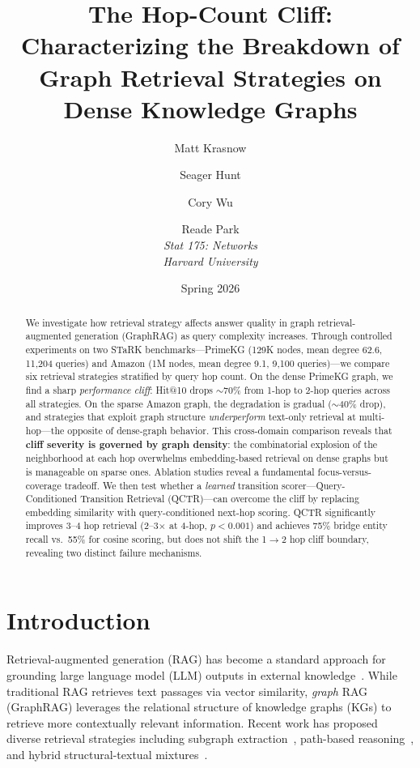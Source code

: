 \documentclass[11pt]{article}
\title{The Hop-Count Cliff: Characterizing the Breakdown of\\Graph Retrieval Strategies on Dense Knowledge Graphs}
\author{
  Matt Krasnow \and Seager Hunt \and Cory Wu \and Reade Park \\
  \textit{Stat 175: Networks} \\
  \textit{Harvard University}
}
\date{Spring 2026}
\begin{document}
\maketitle

\begin{abstract}
We investigate how retrieval strategy affects answer quality in graph retrieval-augmented generation (GraphRAG) as query complexity increases. Through controlled experiments on two STaRK benchmarks---PrimeKG (129K nodes, mean degree 62.6, 11,204 queries) and Amazon (1M nodes, mean degree 9.1, 9,100 queries)---we compare six retrieval strategies stratified by query hop count. On the dense PrimeKG graph, we find a sharp \textit{performance cliff}: Hit@10 drops $\sim$70\% from 1-hop to 2-hop queries across all strategies. On the sparse Amazon graph, the degradation is gradual ($\sim$40\% drop), and strategies that exploit graph structure \textit{underperform} text-only retrieval at multi-hop---the opposite of dense-graph behavior. This cross-domain comparison reveals that \textbf{cliff severity is governed by graph density}: the combinatorial explosion of the neighborhood at each hop overwhelms embedding-based retrieval on dense graphs but is manageable on sparse ones. Ablation studies reveal a fundamental focus-versus-coverage tradeoff. We then test whether a \textit{learned} transition scorer---Query-Conditioned Transition Retrieval (QCTR)---can overcome the cliff by replacing embedding similarity with query-conditioned next-hop scoring. QCTR significantly improves 3--4 hop retrieval (2--3$\times$ at 4-hop, $p < 0.001$) and achieves 75\% bridge entity recall vs.\ 55\% for cosine scoring, but does not shift the 1$\to$2 hop cliff boundary, revealing two distinct failure mechanisms.
\end{abstract}

\section{Introduction}

Retrieval-augmented generation (RAG) has become a standard approach for grounding large language model (LLM) outputs in external knowledge~\citep{lewis2020retrieval}. While traditional RAG retrieves text passages via vector similarity, \textit{graph} RAG (GraphRAG) leverages the relational structure of knowledge graphs (KGs) to retrieve more contextually relevant information. Recent work has proposed diverse retrieval strategies including subgraph extraction~\citep{hu2024grag}, path-based reasoning~\citep{yu2025graphflow}, and hybrid structural-textual mixtures~\citep{yue2025mor}.
\end{document}
